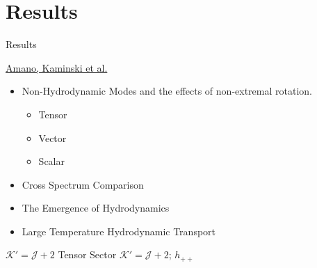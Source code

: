 \documentclass[xcolor=dvipsnames]{beamer}
\begin{document}

\section{Results}

\begin{frame}{Results}

  \href{https://arxiv.org/abs/2308.11686}{Amano, Kaminski et al.}

  \begin{itemize}
    \item Non-Hydrodynamic Modes and the effects of non-extremal rotation.
      \begin{itemize}
        \item Tensor
        \item Vector
        \item Scalar
      \end{itemize}
    \item Cross Spectrum Comparison
    \item The Emergence of Hydrodynamics
    \item Large Temperature Hydrodynamic Transport
  \end{itemize}
\end{frame}

\begin{frame}{\(\mathcal K' = \mathcal J + 2\) Tensor Sector}
  \(\mathcal K' = \mathcal J + 2\); \(h_{++}\)
\end{frame}
\end{document}
